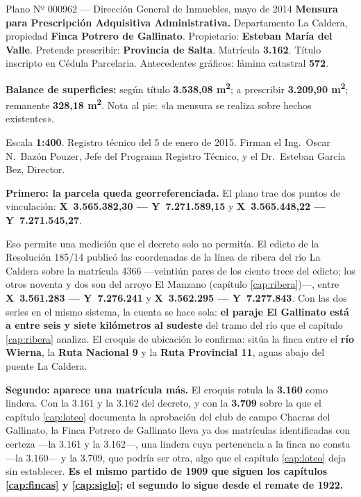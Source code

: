 \begin{ficha}{Plano Nº 000962 --- Dirección General de Inmuebles, mayo de 2014}
\textbf{Mensura para Prescripción Adquisitiva Administrativa.} Departamento La Caldera,
propiedad \textbf{Finca Potrero de Gallinato}. Propietario: \textbf{Esteban María del Valle}.
Pretende prescribir: \textbf{Provincia de Salta}. Matrícula \textbf{3.162}. Título inscripto
en Cédula Parcelaria. Antecedentes gráficos: lámina catastral \textbf{572}.

\textbf{Balance de superficies:} según título \textbf{3.538,08 m\textsuperscript{2}}; a
prescribir \textbf{3.209,90 m\textsuperscript{2}}; remanente \textbf{328,18
m\textsuperscript{2}}. Nota al pie: «la mensura se realiza sobre hechos existentes».

Escala \textbf{1:400}. Registro técnico del 5 de enero de 2015. Firman el Ing.\ Oscar
N.\ Bazón Pouzer, Jefe del Programa Registro Técnico, y el Dr.\ Esteban García Bez, Director.
\end{ficha}

\textbf{Primero: la parcela queda georreferenciada.} El plano trae dos puntos de vinculación:
\textbf{X~3.565.382,30 --- Y~7.271.589,15} y \textbf{X~3.565.448,22 --- Y~7.271.545,27}.

Eso permite una medición que el decreto solo no permitía. El edicto de la Resolución 185/14
publicó las coordenadas de la línea de ribera del río La Caldera sobre la matrícula 4366 ---veintiún pares de los ciento trece del edicto; los otros noventa y dos son del arroyo El Manzano (capítulo \ref{cap:ribera})---, entre \textbf{X~3.561.283 --- Y~7.276.241} y \textbf{X~3.562.295 ---
Y~7.277.843}. Con las dos series en el mismo sistema, la cuenta se hace sola: \textbf{el paraje El Gallinato está a entre seis y siete kilómetros al sudeste} del tramo del río que el capítulo
\ref{cap:ribera} analiza. El croquis de ubicación lo confirma: sitúa
la finca entre el \textbf{río Wierna}, la \textbf{Ruta Nacional 9} y la \textbf{Ruta
Provincial 11}, aguas abajo del puente La Caldera.

\textbf{Segundo: aparece una matrícula más.} El croquis rotula la \textbf{3.160} como
lindera. Con la 3.161 y la 3.162 del decreto, y con la \textbf{3.709} sobre la que el
capítulo \ref{cap:loteo} documenta la aprobación del club de campo Chacras del Gallinato, la Finca Potrero de Gallinato lleva ya dos matrículas identificadas con certeza ---la 3.161 y la 3.162---, una lindera cuya pertenencia a la finca no consta ---la 3.160--- y la 3.709, que podría ser otra, algo que el capítulo \ref{cap:loteo} deja sin establecer. \textbf{Es el mismo
partido de 1909 que siguen los capítulos \ref{cap:fincas} y \ref{cap:siglo}; el segundo lo sigue desde el remate de 1922.}

